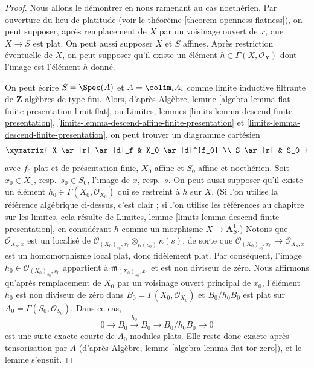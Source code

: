 \begin{proof}
Nous allons le démontrer en nous ramenant au cas noethérien.
Par ouverture du lieu de platitude (voir le
théorème \ref{theorem-openness-flatness}),
on peut supposer, après remplacement de $X$ par un
voisinage ouvert de $x$, que $X \to S$ est plat.
On peut aussi supposer $X$ et $S$ affines.
Après restriction éventuelle de $X$, on peut supposer qu'il existe
un élément $h \in \Gamma(X, \mathcal{O}_X)$ dont l'image est l'élément $h$ donné.

\medskip\noindent
On peut écrire $S = \Spec(A)$ et $A = \colim_i A_i$
comme limite inductive filtrante de $\mathbf{Z}$-algèbres de type fini.
Alors, d'après
Algèbre, lemme \ref{algebra-lemma-flat-finite-presentation-limit-flat},
ou
Limites, lemmes \ref{limits-lemma-descend-finite-presentation},
\ref{limits-lemma-descend-affine-finite-presentation} et
\ref{limits-lemma-descend-finite-presentation},
on peut trouver un diagramme cartésien
$$
\xymatrix{
X \ar[r] \ar[d]_f & X_0 \ar[d]^{f_0} \\
S \ar[r] & S_0
}
$$
avec $f_0$ plat et de présentation finie, $X_0$ affine et
$S_0$ affine et noethérien. Soit $x_0 \in X_0$, resp.\ $s_0 \in S_0$,
l'image de $x$, resp.\ $s$. On peut aussi supposer qu'il existe un élément
$h_0 \in \Gamma(X_0, \mathcal{O}_{X_0})$ qui se restreint à $h$ sur $X$.
(Si l'on utilise la référence algébrique ci-dessus, c'est clair ; si l'on utilise
les références au chapitre sur les limites, cela résulte de
Limites, lemme \ref{limits-lemma-descend-finite-presentation},
en considérant $h$ comme un morphisme $X \to \mathbf{A}^1_S$.)
Notons que $\mathcal{O}_{X_s, x}$ est un localisé de
$\mathcal{O}_{(X_0)_{s_0}, x_0} \otimes_{\kappa(s_0)} \kappa(s)$, de sorte que
$\mathcal{O}_{(X_0)_{s_0}, x_0} \to \mathcal{O}_{X_s, x}$ est un homomorphisme
local plat, donc fidèlement plat. Par conséquent, l'image
$\overline{h}_0 \in \mathcal{O}_{(X_0)_{s_0}, x_0}$
appartient à $\mathfrak m_{(X_0)_{s_0}, x_0}$ et est non diviseur de zéro.
Nous affirmons qu'après remplacement de $X_0$ par un voisinage ouvert principal de
$x_0$, l'élément $h_0$ est non diviseur de zéro dans
$B_0 = \Gamma(X_0, \mathcal{O}_{X_0})$ et $B_0/h_0B_0$ est plat
sur $A_0 = \Gamma(S_0, \mathcal{O}_{S_0})$.
Dans ce cas,
$$
0 \to B_0 \xrightarrow{h_0} B_0 \to B_0/h_0B_0 \to 0
$$
est une suite exacte courte de $A_0$-modules plats. Elle reste donc exacte
après tensorisation par $A$ (d'après
Algèbre, lemme \ref{algebra-lemma-flat-tor-zero}),
et le lemme s'ensuit.


\end{proof}
